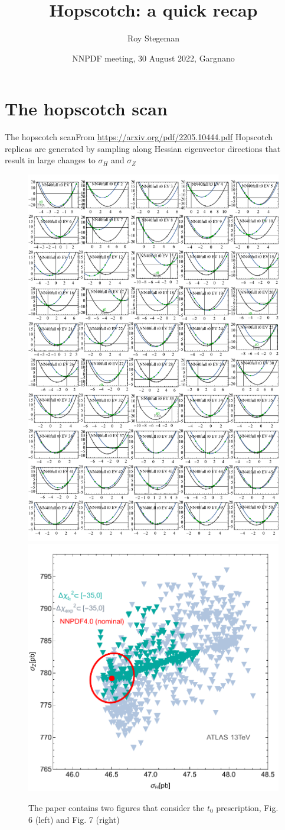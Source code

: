 \documentclass[aspectratio=169,10pt]{beamer}
\title{Hopscotch: a quick recap}
\date{NNPDF meeting, 30 August 2022, Gargnano}
\author{Roy Stegeman}
\institute{University of Milan and INFN Milan}
\begin{document}
{
\begin{frame}
  \titlepage
\end{frame}
}



\section{The hopscotch scan}

\begin{frame}[t]{The hopscotch scan}{From \url{https://arxiv.org/pdf/2205.10444.pdf}}
  Hopscotch replicas are generated by sampling along Hessian eigenvector directions that result in large changes to $\sigma_H$ and $\sigma_Z$
  \begin{figure}
    \centering
    \includegraphics[width=.2\textwidth]{220510_t0_vs_exp_parabolas.pdf}
    \hspace*{1em}
    \includegraphics[width=.3\textwidth]{220512_scatter_HZ_exp_t0.pdf}
    \caption*{The paper contains two figures that consider the $t_0$ prescription, Fig. 6 (left) and Fig. 7 (right)}
  \end{figure}
\end{frame}
\end{document}
